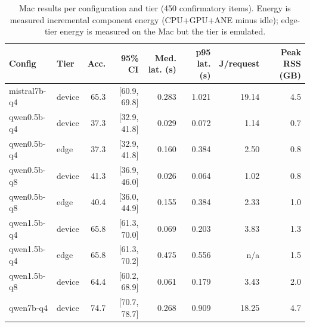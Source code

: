 \begin{table}[t]\centering\small
\caption{Mac results per configuration and tier (450 confirmatory items). Energy is measured incremental component energy (CPU+GPU+ANE minus idle); edge-tier energy is measured on the Mac but the tier is emulated.}\label{tab:mac}
\begin{tabular}{@{}llrrrrrr@{}}\toprule
Config & Tier & Acc. & 95\% CI & Med. lat. (s) & p95 lat. (s) & J/request & Peak RSS (GB)\\\midrule
mistral7b-q4 & device & 65.3 & [60.9, 69.8] & 0.283 & 1.021 & 19.14 & 4.5\\
qwen0.5b-q4 & device & 37.3 & [32.9, 41.8] & 0.029 & 0.072 & 1.14 & 0.7\\
qwen0.5b-q4 & edge & 37.3 & [32.9, 41.8] & 0.160 & 0.384 & 2.50 & 0.8\\
qwen0.5b-q8 & device & 41.3 & [36.9, 46.0] & 0.026 & 0.064 & 1.02 & 0.8\\
qwen0.5b-q8 & edge & 40.4 & [36.0, 44.9] & 0.155 & 0.384 & 2.33 & 1.0\\
qwen1.5b-q4 & device & 65.8 & [61.3, 70.0] & 0.069 & 0.203 & 3.83 & 1.3\\
qwen1.5b-q4 & edge & 65.8 & [61.3, 70.2] & 0.475 & 0.556 & n/a & 1.5\\
qwen1.5b-q8 & device & 64.4 & [60.2, 68.9] & 0.061 & 0.179 & 3.43 & 2.0\\
qwen7b-q4 & device & 74.7 & [70.7, 78.7] & 0.268 & 0.909 & 18.25 & 4.7\\
\bottomrule\end{tabular}\end{table}
